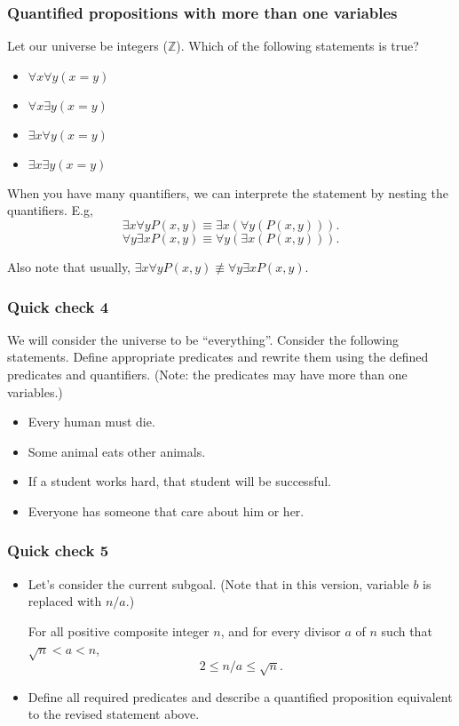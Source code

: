 \begin{frame}\frametitle{Quantified propositions with more than one variables}
  Let our universe be integers ($\mathbb Z$).  Which of the following statements is true?

  \begin{itemize}
  \item $\forall x\forall y (x=y)$
  \item $\forall x\exists y (x=y)$
  \item $\exists x\forall y (x=y)$
  \item $\exists x\exists y (x=y)$
  \end{itemize}

  \pause

  When you have many quantifiers, we can interprete the statement by
  nesting the quantifiers. E.g,
  \[\exists x\forall y P(x,y)\equiv \exists x (\forall y (P(x,y))).\]
  \[\forall y\exists x P(x,y)\equiv \forall y (\exists x (P(x,y))).\]
  \pause

  Also note that usually, $\exists x\forall y P(x,y)\not\equiv \forall
  y\exists x P(x,y)$.
\end{frame}

\begin{frame}\frametitle{Quick check 4}
  We will consider the universe to be ``everything''.  Consider the
  following statements.  Define appropriate predicates and rewrite
  them using the defined predicates and quantifiers.  (Note: the
  predicates may have more than one variables.)
  \begin{itemize}
  \item Every human must die.
  \item Some animal eats other animals.
  \item If a student works hard, that student will be successful.
  \item Everyone has someone that care about him or her.
  \end{itemize}                  
\end{frame}

\begin{frame}\frametitle{Quick check 5}
  \begin{itemize}
  \item Let's consider the current subgoal.  (Note that in this
    version, variable $b$ is replaced with $n/a$.)
    
    \begin{tcolorbox}[title=Another revised statement]
      For all positive composite integer $n$, and for every divisor
      $a$ of $n$ such that $\sqrt{n} < a < n$,
      \[ 2\leq n/a \leq\sqrt{n}.\]
    \end{tcolorbox}

  \item Define all required predicates and describe a quantified
    proposition equivalent to the revised statement above.

    \vspace{1in}
    
  \end{itemize}
\end{frame}

